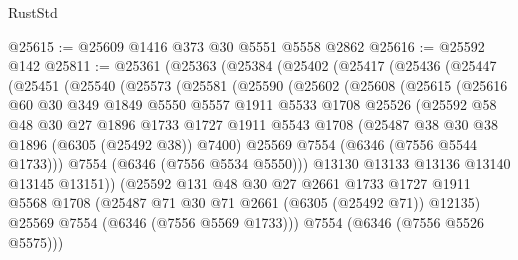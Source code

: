 \begin{lexlean}{RustStd}
\begin{coremodule}
@25615 := @25609 @1416 @373 @30 @5551 @5558 @2862
@25616 := @25592 @142
@25811 := @25361
    (@25363
      (@25384
        (@25402
          (@25417
            (@25436
              (@25447
                (@25451
                  (@25540
                    (@25573
                      (@25581
                        (@25590
                          (@25602
                            (@25608
                              (@25615
                                (@25616
                                  @60
                                  @30
                                  @349
                                  @1849
                                  @5550
                                  @5557
                                  @1911
                                  @5533
                                  @1708
                                  @25526
                                  (@25592
                                    @58
                                    @48
                                    @30
                                    @27
                                    @1896
                                    @1733
                                    @1727
                                    @1911
                                    @5543
                                    @1708
                                    (@25487 @38 @30 @38 @1896 (@6305 (@25492 @38)) @7400)
                                    @25569
                                    @7554
                                    (@6346 (@7556 @5544 @1733)))
                                  @7554
                                  (@6346 (@7556 @5534 @5550)))
                                @13130
                                @13133
                                @13136
                                @13140
                                @13145
                                @13151))
                            (@25592
                              @131
                              @48
                              @30
                              @27
                              @2661
                              @1733
                              @1727
                              @1911
                              @5568
                              @1708
                              (@25487 @71 @30 @71 @2661 (@6305 (@25492 @71)) @12135)
                              @25569
                              @7554
                              (@6346 (@7556 @5569 @1733)))
                            @7554
                            (@6346 (@7556 @5526 @5575)))

\end{coremodule}
\end{lexlean}
